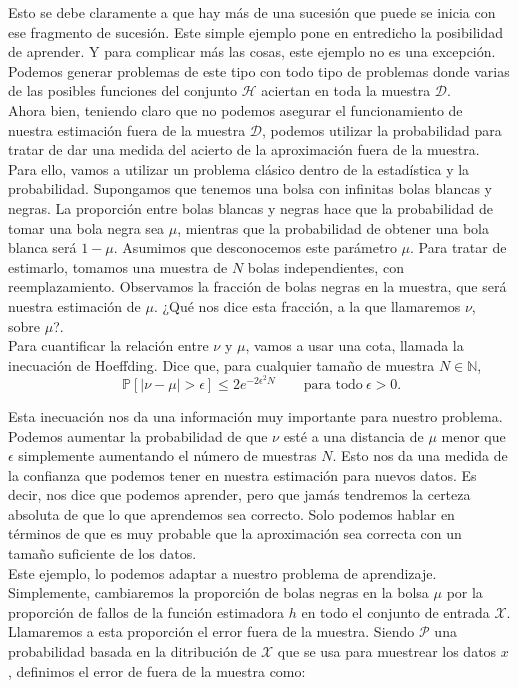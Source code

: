 Esto se debe claramente a que hay más de una sucesión que puede se inicia con ese fragmento de sucesión. Este simple ejemplo pone en entredicho la posibilidad de aprender. Y para complicar más las cosas, este ejemplo no es una excepción. Podemos generar problemas de este tipo con todo tipo de problemas donde varias de las posibles funciones del conjunto $\mathcal{H}$ aciertan en toda la muestra $\mathcal{D}$.\\

Ahora bien, teniendo claro que no podemos asegurar el funcionamiento de nuestra estimación fuera de la muestra $\mathcal{D}$, podemos utilizar la probabilidad para tratar de dar una medida del acierto de la aproximación fuera de la muestra.\\

Para ello, vamos a utilizar un problema clásico dentro de la estadística y la probabilidad. Supongamos que tenemos una bolsa con infinitas bolas blancas y negras. La proporción entre bolas blancas y negras hace que la probabilidad de tomar una bola negra sea $\mu$, mientras que la probabilidad de obtener una bola blanca será $1-\mu$. Asumimos que desconocemos este parámetro $\mu$. Para tratar de estimarlo, tomamos una muestra de $N$ bolas independientes, con reemplazamiento. Observamos la fracción de bolas negras en la muestra, que será nuestra estimación de $\mu$. ¿Qué nos dice esta fracción, a la que llamaremos $\nu$, sobre $\mu$?.\\

Para cuantificar la relación entre $\nu$ y $\mu$, vamos a usar una cota, llamada la inecuación de Hoeffding. Dice que, para cualquier tamaño de muestra $N \in \mathbb{N}$,\\
\[
\ \mathbb{P}\left[ \mid \nu - \mu \mid > \epsilon \right] \leq 2e^{-2\epsilon^2 N} \qquad \textrm{para todo} \  \epsilon > 0.
\]

Esta inecuación nos da una información muy importante para nuestro problema. Podemos aumentar la probabilidad de que $\nu$ esté a una distancia de $\mu$ menor que $\epsilon$ simplemente aumentando el número de muestras $N$. Esto nos da una medida de la confianza que podemos tener en nuestra estimación para nuevos datos. Es decir, nos dice que podemos aprender, pero que jamás tendremos la certeza absoluta de que lo que aprendemos sea correcto. Solo podemos hablar en términos de que es muy probable que la aproximación sea correcta con un tamaño suficiente de los datos.\\

Este ejemplo, lo podemos adaptar a nuestro problema de aprendizaje. Simplemente, cambiaremos la proporción de bolas negras en la bolsa $\mu$ por la proporción de fallos de la función estimadora $h$ en todo el conjunto de entrada $\mathcal{X}$. Llamaremos a esta proporción el error fuera de la muestra. Siendo $\mathcal{P}$ una probabilidad basada en la ditribución de $\mathcal{X}$ que se usa para muestrear los datos $x$, definimos el error de fuera de la muestra como:

